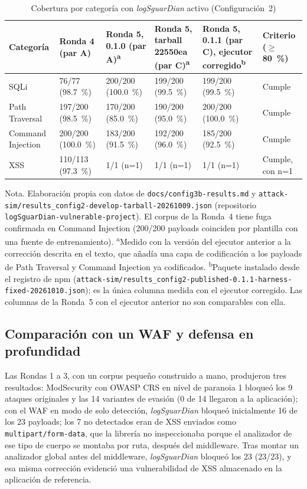 \begin{table}[H]
\centering
\small
\begin{tabular}{|L{2.2cm}|L{1.9cm}|L{2.0cm}|L{2.0cm}|L{2.2cm}|L{1.9cm}|}
\hline
\textbf{Categoría} & \textbf{Ronda 4 (par A)} & \textbf{Ronda 5, 0.1.0 (par A)\textsuperscript{a}} & \textbf{Ronda 5, tarball 22550ea (par C)\textsuperscript{a}} & \textbf{Ronda 5, 0.1.1 (par C), ejecutor corregido\textsuperscript{b}} & \textbf{Criterio ($\geq$80~\%)} \\ \hline
SQLi & 76/77 (98.7~\%) & 200/200 (100.0~\%) & 199/200 (99.5~\%) & 199/200 (99.5~\%) & Cumple \\ \hline
Path Traversal & 197/200 (98.5~\%) & 170/200 (85.0~\%) & 190/200 (95.0~\%) & 200/200 (100.0~\%) & Cumple \\ \hline
Command Injection & 200/200 (100.0~\%) & 183/200 (91.5~\%) & 192/200 (96.0~\%) & 185/200 (92.5~\%) & Cumple \\ \hline
XSS & 110/113 (97.3~\%) & 1/1 (n=1) & 1/1 (n=1) & 1/1 (n=1) & Cumple, con n=1 \\ \hline
\end{tabular}
\caption[Cobertura por categoría con logsguardian]{Cobertura por categoría con \textit{logSguarDian} activo (Configuración~2)}
\label{tab:res-cobertura}
\end{table}
{\footnotesize Nota. Elaboración propia con datos de \texttt{docs/config3b-results.md} y
\texttt{attack-sim/results\_config2-develop-tarball-20261009.json} (repositorio
\texttt{logSguarDian-vulnerable-project}). El corpus de la Ronda~4 tiene fuga confirmada en Command Injection (200/200 payloads coinciden por plantilla con
una fuente de entrenamiento). \textsuperscript{a}Medido con la versión del ejecutor anterior a la
corrección descrita en el texto, que añadía una capa de codificación a los payloads de Path
Traversal y Command Injection ya codificados. \textsuperscript{b}Paquete instalado desde el registro de
npm (\texttt{attack-sim/results\_config2-published-0.1.1-harness-fixed-20261010.json}); es la única
columna medida con el ejecutor corregido. Las columnas de la Ronda~5 con el ejecutor anterior no
son comparables con ella.}

\subsection{Comparación con un WAF y defensa en profundidad}

Las Rondas 1 a 3, con un corpus pequeño construido a mano, produjeron tres resultados: ModSecurity
con OWASP CRS en nivel de paranoia 1 bloqueó los 9 ataques originales y las 14 variantes de evasión
(0 de 14 llegaron a la aplicación); con el WAF en modo de solo detección, \textit{logSguarDian} bloqueó inicialmente 16 de los 23
payloads; los 7 no detectados eran de XSS enviados como \texttt{multipart/form-data}, que la
librería no inspeccionaba porque el analizador de ese tipo de cuerpo se montaba por ruta, después
del middleware. Tras montar un analizador global antes del middleware, \textit{logSguarDian}
bloqueó los 23 (23/23), y esa misma corrección evidenció una vulnerabilidad de XSS almacenado en la
aplicación de referencia.

